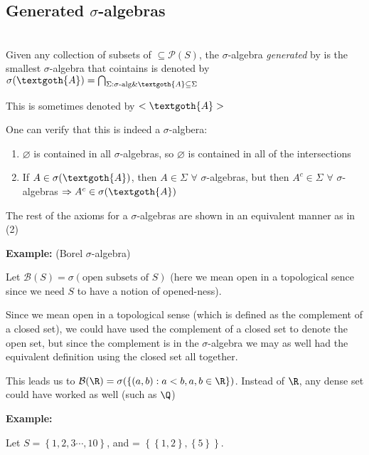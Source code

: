 \subsection{Generated $\sigma$-algebras}\hfill\\
\noindent Given any collection of subsets of $\subseteq\mathcal{P}(S)$, the $\sigma$-algebra \textit{generated} by  is the smallest $\sigma$-algebra that cointains  is denoted by $\sigma(\textgoth{A}) = \bigcap_{\Sigma:\sigma\text{-alg}\&\textgoth{A}\subseteq\Sigma}$\par
\noindent This is sometimes denoted by $<\textgoth{A}>$
\par\bigskip
\noindent One can verify that this is indeed a $\sigma$-algbera:\par
\begin{enumerate}[leftmargin=*]
  \item$\varnothing$ is contained in all $\sigma$-algebras, so $\varnothing$ is contained in all of the intersections
  \item If $A\in\sigma(\textgoth{A})$, then $A\in\Sigma$ $\forall$ $\sigma$-algebras, but then $A^c\in\Sigma$ $\forall$ $\sigma$-algebras $\Rightarrow A^c\in\sigma(\textgoth{A})$
\end{enumerate}\par
\noindent The rest of the axioms for a $\sigma$-algebras are shown in an equivalent manner as in (2)
\par\bigskip
\noindent\textbf{Example:} (Borel $\sigma$-algebra)\par
\noindent Let $\mathcal{B}(S) = \sigma(\text{open subsets of $S$})$ (here we mean open in a topological sence since we need $S$ to have a notion of opened-ness).\par
\noindent Since we mean open in a topological sense (which is defined as the complement of a closed set), we could have used the complement of a closed set to denote the open set, but since the complement is in the $\sigma$-algebra we may as well had the equivalent definition using the closed set all together.\par
\noindent This leads us to $\mathcal{B}(\R) = \sigma(\left\{(a,b):a<b, a,b\in\R\right\})$. Instead of $\R$, any dense set could have worked as well (such as $\Q$)
\par\bigskip
\noindent\textbf{Example:}\par
\noindent Let $S= \left\{1,2,3\cdots,10\right\}$, and  = $\left\{\left\{1,2\right\},\left\{5\right\}\right\}$.\par
